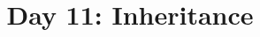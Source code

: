 \documentclass{article}
\begin{document}
\title{Day 11: Inheritance}
\author{}
\date{}
\maketitle





\end{document}
